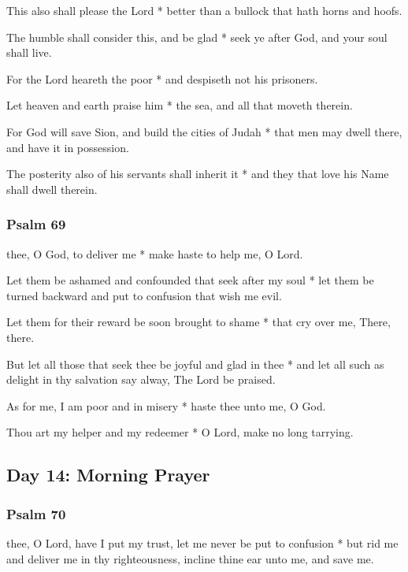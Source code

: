 This also shall please the Lord * better than a bullock that hath horns and hoofs.

The humble shall consider this, and be glad * seek ye after God, and your soul shall live.

For the Lord heareth the poor * and despiseth not his prisoners.

Let heaven and earth praise him * the sea, and all that moveth therein.

For God will save Sion, and build the cities of Judah * that men may dwell there, and have it in possession.

The posterity also of his servants shall inherit it * and they that love his Name shall dwell therein.

\subsubsection{Psalm 69}


 thee, O God, to deliver me * make haste to help me, O Lord.

Let them be ashamed and confounded that seek after my soul * let them be turned backward and put to confusion that wish me evil.

Let them for their reward be soon brought to shame * that cry over me, There, there.

But let all those that seek thee be joyful and glad in thee * and let all such as delight in thy salvation say alway, The Lord be praised.

As for me, I am poor and in misery * haste thee unto me, O God.

Thou art my helper and my redeemer * O Lord, make no long tarrying.

\subsection{Day 14: Morning Prayer}

\subsubsection{Psalm 70}


 thee, O Lord, have I put my trust, let me never be put to confusion * but rid me and deliver me in thy righteousness, incline thine ear unto me, and save me.

